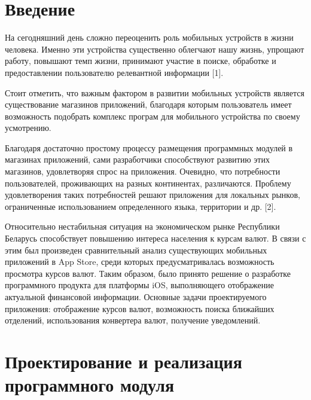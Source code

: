 \documentclass[a4paper,11pt,twoside]{article}
\begin{document}



\begin{multicols}{2}

\section*{Введение}

На сегодняшний день сложно переоценить роль мобильных устройств в жизни человека.
Именно эти устройства существенно облегчают нашу жизнь, упрощают работу,
повышают темп жизни, принимают участие в поиске, обработке и предоставлении
пользователю релевантной информации [1].

Стоит отметить, что важным фактором в развитии мобильных устройств является
существование магазинов приложений, благодаря которым пользователь имеет
возможность подобрать комплекс програм для мобильного устройства по своему усмотрению.

Благодаря достаточно простому процессу размещения программных модулей в магазинах
приложений, сами разработчики способствуют развитию этих магазинов, удовлетворяя
спрос на приложения. Очевидно, что потребности пользователей,
проживающих на разных континентах, различаются.
Проблему удовлетворения таких потребностей решают приложения для локальных рынков,
ограниченные использованием определенного языка, территории и др. [2].

Относительно нестабильная ситуация на экономическом рынке Республики Беларусь
способствует повышению интереса населения к курсам валют. В связи с этим был
произведен сравнительный анализ существующих мобильных приложений в App Store,
среди которых предусматривалась возможность просмотра курсов валют.
Таким образом, было принято решение о разработке программного
продукта для платформы iOS, выполняющего отображение актуальной финансовой
информации. Основные задачи проектируемого приложения: отображение курсов валют,
возможность поиска ближайших отделений, использования конвертера валют,
получение уведомлений.

\section{Проектирование и реализация программного модуля}


\end{multicols}
\end{document}
